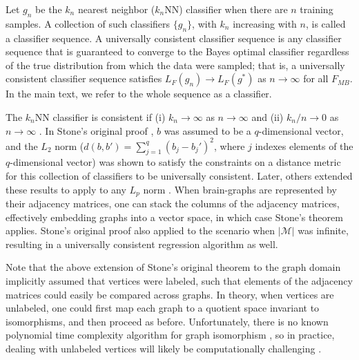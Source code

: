 \documentclass{article}
\providecommand{\mc}[1]{\mathcal{#1}}
\newcommand{\conv}{\rightarrow}
\begin{document}
Let $g_n$ be the $k_n$ nearest neighbor ($k_n$NN) classifier when there are $n$ training samples.  
A collection of such classifiers $\{g_n\}$,  with $k_n$ increasing with $n$, is called a classifier sequence.  
A universally consistent classifier sequence is any classifier sequence that is guaranteed to converge to the Bayes optimal classifier regardless of the true distribution from which the data were sampled; that is, a universally consistent classifier sequence satisfies $L_F(g_n) \conv L_F(g^*)$ as $n \conv \infty$ for all $F_{MB}$. In the main text, we refer to the whole sequence as a classifier.

The $k_n$NN classifier is consistent if (i) $k_n \conv \infty$ as $n \conv \infty$ and (ii) $k_n/n \conv 0$ as $n\conv\infty$ \cite{Stone1977}. In Stone's original proof \cite{Stone1977}, $b$ was assumed to be a $q$-dimensional vector, and the $L_2$ norm ($d(b,b')=\sum_{j=1}^q (b_j-b_j')^2$, where $j$ indexes elements of the $q$-dimensional vector) was shown to satisfy the constraints on a distance metric for this collection of classifiers to be universally consistent.  Later, others extended these results to apply to any $L_p$ norm \cite{DGL96}.  When brain-graphs are represented by their adjacency matrices, one can stack the columns of the adjacency matrices, effectively embedding graphs into a vector space, in which case Stone's theorem applies.  Stone's original proof also applied to the scenario when $|\mc{M}|$ was infinite, resulting in a universally consistent regression algorithm as well.

Note that the above extension of Stone's original theorem to the graph domain implicitly assumed that vertices were labeled, such that elements of the adjacency matrices could easily be compared across graphs.  In theory, when vertices are unlabeled, one could first map each graph to a quotient space invariant to isomorphisms, and then proceed as before.  Unfortunately, 
there is no known polynomial time complexity algorithm for graph isomorphism
\cite{GareyJohnson79}, so in practice, dealing with unlabeled vertices will likely be computationally challenging \cite{VP11_unlabeled}.



\end{document}
